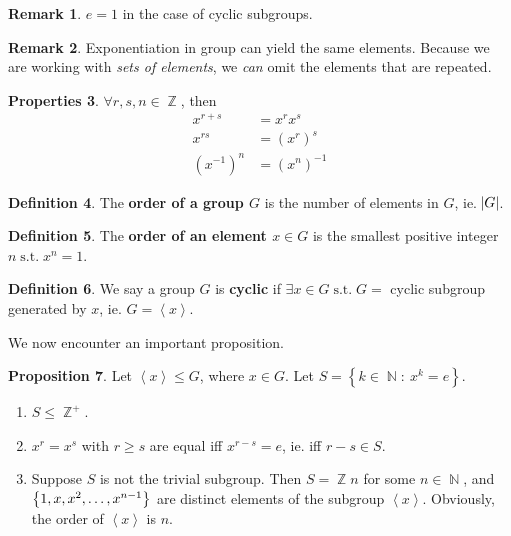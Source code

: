 \documentclass[11pt]{amsart} %
\theoremstyle{definition}
\newtheorem{definition}{Definition}[section]
\newtheorem{proposition}[definition]{Proposition}
\newtheorem{properties}[definition]{Properties}
\theoremstyle{definition}
\newtheorem{remark}[definition]{Remark}
\DeclareMathOperator{\N}{\mathbb{N}}
\DeclareMathOperator{\Z}{\mathbb{Z}}
\DeclareMathOperator{\suchthat}{\text{ s.t. }}
\numberwithin{equation}{section}
\newcommand{\condset}[4]{\left\{ #1  : \: #2 #3 #4 \right\}}
\newcommand{\cyclic}[1]{\left\langle #1 \right\rangle}
\begin{document}
\begin{remark}
	$e = 1$ in the case of cyclic subgroups.
\end{remark}

\begin{remark}
	Exponentiation in group can yield the same elements. Because we are working with \textit{sets of elements}, we \textit{can} omit the elements that are repeated.
\end{remark}

\begin{properties}
	$\forall r,s, n \in \Z$, then
	$$\begin{aligned}
	x^{r+s} &= x^r x^s \\
	x^{rs} &= (x^r)^s	\\
	(x^{-1})^{n} &= (x^n)^{-1}
	\end{aligned}$$
\end{properties}

\begin{definition}
	The \textbf{order of a group $G$} is the number of elements in $G$, ie. $\abs{G}$. 
\end{definition}

\begin{definition}
	The \textbf{order of an element $x \in G$} is the smallest positive integer $n \suchthat x^n = 1$.
\end{definition}

\begin{definition}
	We say a group $G$ is \textbf{cyclic} if $\exists x \in G \suchthat G=$ cyclic subgroup generated by $x$, ie. $G =\cyclic{x} $.
\end{definition}

We now encounter an important proposition.

\begin{proposition}
	\label{propcyclicassubgroupofZ+}
	Let $\cyclic{x} \leq G$, where $x \in G$. Let $S = \condset{k \in \N}{x^k}{=}{e}$.
	\begin{enumerate}
		\item $S \leq \Z^+$.
		\item $x^r = x^s $ with $r \geq s$ are equal iff $x^{r-s} = e$, ie. iff $r - s \in S$.
		\item Suppose $S$ is not the trivial subgroup. Then $S = \Z n$ for some $n\in \N$, and $\set{1,x,x^2,\dots,x^{n-1}}$ are distinct elements of the subgroup $\cyclic{x}$. Obviously, the order of $\cyclic{x}$ is $n$.
	\end{enumerate}
\end{proposition}
\end{document}
